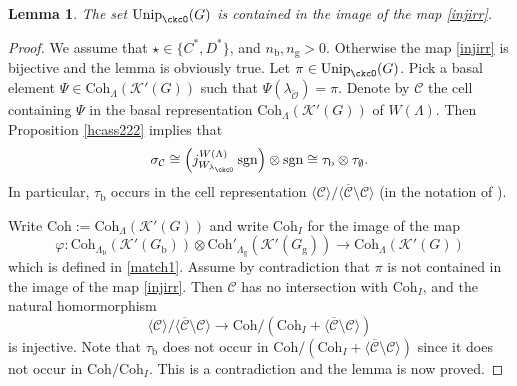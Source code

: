 \documentclass[12pt,a4paper]{amsart}
\newcommand{\CC}{{\mathcal {C}}}
\newcommand{\CK}{{\mathcal {K}}}
\newcommand{\CO}{{\mathcal {O}}}
\newcommand{\sgn}{\operatorname{sgn}}
\newcommand{\la}{\langle}
\newcommand{\ra}{\rangle}
\numberwithin{equation}{section}
\newtheorem{lem}[thm]{Lemma}
\theoremstyle{remark}
\def\Unip{\mathrm{Unip}}
\def\Coh{\mathrm{Coh}}
\begin{document}
\begin{lem}\label{imageu}
The set $\Unip_{\ckcO}(G)$ is contained in the image of the map \eqref{injirr}.
\end{lem}
\begin{proof}
We  assume that $\star\in\{C^*, D^*\}$, and $n_\mathrm b, n_\mathrm g>0$. Otherwise the map \eqref{injirr} is bijective and the lemma is obviously true.
Let $\pi\in \Unip_{\ckcO}(G)$. Pick a basal  element $\Psi\in \Coh_{ \Lambda}(\CK'(G))$ such that $\Psi(\lambda_{\check \CO})=\pi$.
 Denote by $\CC$ the cell  containing $\Psi$ in the basal representation $ \Coh_{\Lambda}(\CK'(G))$ of $W(\Lambda)$. Then Proposition \ref{hcass222} implies that
 \[
  \sigma_\CC\cong  \left( j_{W_{\lambda_\ckcO}}^{W(\Lambda)} \sgn\right)\otimes \sgn\cong \tau_\mathrm b\otimes \tau_{\emptyset}.
  \]
  In particular, $\tau_\mathrm b$ occurs in the cell representation $\la \CC\ra /\la \overline \CC\setminus \CC\ra$ (in the notation of ).

  Write $\Coh:= \Coh_{\Lambda}(\CK'(G))$ and write $\Coh_I$ for the image of the map
\[
  \varphi: \Coh_{\Lambda_\mathrm b}(\CK'(G_\mathrm b))\otimes \Coh'_{\Lambda_\mathrm g}(\CK'(G_\mathrm g))\rightarrow \Coh_{\Lambda}(\CK'(G))
\]
which is defined in \eqref{match1}. Assume by contradiction that $\pi$ is not contained in the image of the map \eqref{injirr}. Then $\CC$ has no intersection with $\Coh_I$,  and the natural homormorphism
\[
\la \CC\ra /\la \overline \CC\setminus \CC\ra \rightarrow \Coh/(\Coh_I+\la \overline \CC\setminus \CC\ra )
\]
is injective. Note that $\tau_\mathrm b$ does not occur in  $\Coh/(\Coh_I+\la \overline \CC\setminus \CC\ra )$ since it does not occur in  $\Coh/\Coh_I$. This is a contradiction and the lemma is now proved.
\end{proof}
\end{document}
